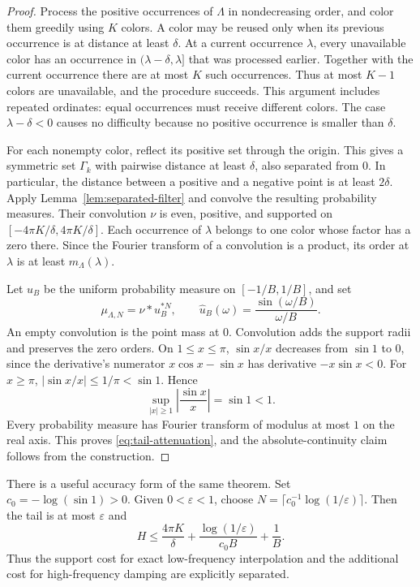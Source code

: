 \begin{proof}
Process the positive occurrences of $\Lambda$ in nondecreasing order,
and color them greedily using $K$ colors. A color may be reused only
when its previous occurrence is at distance at least $\delta$.
At a current occurrence $\lambda$, every unavailable color has an
occurrence in $(\lambda-\delta,\lambda]$ that was processed earlier.
Together with the current occurrence there are at most $K$ such
occurrences. Thus at most $K-1$ colors are unavailable, and the
procedure succeeds. This argument includes repeated ordinates: equal
occurrences must receive different colors. The case
$\lambda-\delta<0$ causes no difficulty because no positive occurrence
is smaller than $\delta$.

For each nonempty color, reflect its positive set through the origin.
This gives a symmetric set $\Gamma_k$ with pairwise distance at least
$\delta$, also separated from $0$. In particular, the distance between
a positive and a negative point is at least $2\delta$. Apply
Lemma~\ref{lem:separated-filter} and convolve the resulting probability
measures. Their convolution $\nu$ is even, positive, and supported on
$[-4\pi K/\delta,4\pi K/\delta]$. Each occurrence of $\lambda$ belongs
to one color whose factor has a zero there. Since the Fourier transform
of a convolution is a product, its order at $\lambda$ is at least
$m_\Lambda(\lambda)$.

Let $u_B$ be the uniform probability measure on $[-1/B,1/B]$, and set
\[
 \mu_{\Lambda,N}=\nu*u_B^{*N},\qquad
 \widehat u_B(\omega)=\frac{\sin(\omega/B)}{\omega/B}.
\]
An empty convolution is the point mass at $0$. Convolution adds the
support radii and preserves the zero orders. On $1\le x\le\pi$,
$\sin x/x$ decreases from $\sin1$ to $0$, since the derivative's
numerator $x\cos x-\sin x$ has derivative $-x\sin x<0$. For
$x\ge\pi$, $|\sin x/x|\le1/\pi<\sin1$. Hence
\[
 \sup_{|x|\ge1}\left|\frac{\sin x}{x}\right|=\sin1<1.
\]
Every probability measure has Fourier transform of modulus at most
$1$ on the real axis. This proves \eqref{eq:tail-attenuation}, and the
absolute-continuity claim follows from the construction.
\end{proof}

There is a useful accuracy form of the same theorem. Set
$c_0=-\log(\sin1)>0$. Given $0<\varepsilon<1$, choose
$N=\lceil c_0^{-1}\log(1/\varepsilon)\rceil$. Then the tail is at most
$\varepsilon$ and
\[
 H\le\frac{4\pi K}{\delta}
       +\frac{\log(1/\varepsilon)}{c_0B}+\frac1B.
\]
Thus the support cost for exact low-frequency interpolation and the
additional cost for high-frequency damping are explicitly separated.

